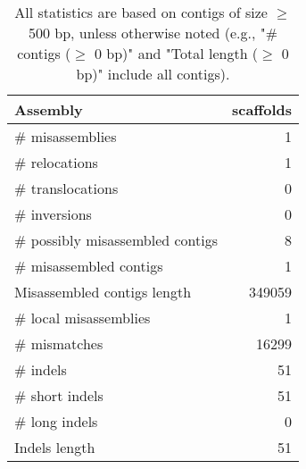 \documentclass[12pt,a4paper]{article}
\begin{document}
\begin{table}[ht]
\begin{center}
\caption{All statistics are based on contigs of size $\geq$ 500 bp, unless otherwise noted (e.g., "\# contigs ($\geq$ 0 bp)" and "Total length ($\geq$ 0 bp)" include all contigs).}
\begin{tabular}{|l*{1}{|r}|}
\hline
Assembly & scaffolds \\ \hline
\# misassemblies & 1 \\ \hline
\hspace{5mm}\# relocations & 1 \\ \hline
\hspace{5mm}\# translocations & 0 \\ \hline
\hspace{5mm}\# inversions & 0 \\ \hline
\# possibly misassembled contigs & 8 \\ \hline
\# misassembled contigs & 1 \\ \hline
Misassembled contigs length & 349059 \\ \hline
\# local misassemblies & 1 \\ \hline
\# mismatches & 16299 \\ \hline
\# indels & 51 \\ \hline
\hspace{5mm}\# short indels & 51 \\ \hline
\hspace{5mm}\# long indels & 0 \\ \hline
Indels length & 51 \\ \hline
\end{tabular}
\end{center}
\end{table}
\end{document}
